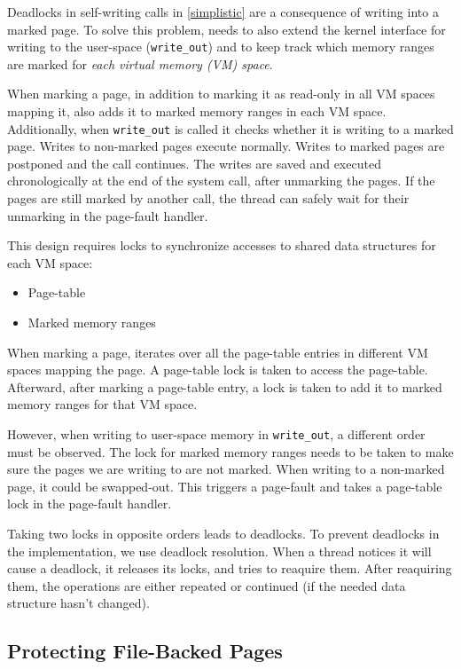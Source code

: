 Deadlocks in self-writing calls in \autoref{simplistic} are a consequence of
writing into a marked page. To solve this problem, \sysname needs to also extend
the kernel interface for writing to the user-space (\texttt{write\_out}) and to
keep track which memory ranges are marked for \emph{each virtual memory (VM) space}.

When marking a page, in addition to marking it as read-only in all VM spaces
mapping it, \sysname also adds it to marked memory ranges in each VM space.
Additionally, when \texttt{write\_out} is called it checks whether it is writing
to a marked page. Writes to non-marked pages execute normally. Writes to marked
pages are postponed and the call continues. The writes are saved and executed
chronologically at the end of the system call, after unmarking the pages. If the
pages are still marked by another call, the thread can safely wait for their
unmarking in the page-fault handler.

This design requires locks to synchronize accesses to shared data structures for each VM space:
\begin{itemize}
  \item Page-table
  \item Marked memory ranges
\end{itemize}

When marking a page, \sysname iterates over all the page-table entries in different
VM spaces mapping the page. A page-table lock is taken to access the page-table.
Afterward, after marking a page-table entry, a lock is taken to add it
to marked memory ranges for that VM space.

However, when writing to user-space memory in \texttt{write\_out}, a different 
order must be observed. The lock for marked memory ranges needs to be taken to
make sure the pages we are writing to are not marked. When writing to a non-marked
page, it could be swapped-out. This triggers a page-fault and takes a page-table lock
in the page-fault handler.

Taking two locks in opposite orders leads to deadlocks. To prevent deadlocks
in the \sysname implementation, we use deadlock resolution. When a thread notices
it will cause a deadlock, it releases its locks, and tries to reaquire them.
After reaquiring them, the operations are either repeated or continued (if the
needed data structure hasn't changed).

\subsection{Protecting File-Backed Pages}

